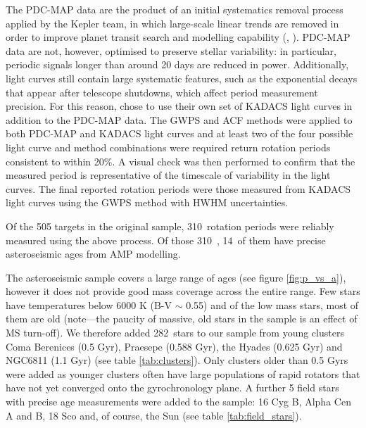 \documentclass[12pt,preprint]{aastex}
\newcommand{\nastero}{310~}
\newcommand{\nprecise}{14~}
\newcommand{\ncluster}{282~}
\begin{document}
The PDC-MAP data are the product of an initial systematics removal process applied by the Kepler team, in which large-scale linear trends are removed in order to improve planet transit search and modelling capability (\citet{Smith_2012}, \citet{Stumpe_2012}).
PDC-MAP data are not, however, optimised to preserve stellar variability: in particular, periodic signals longer than around 20 days are reduced in power.
Additionally, light curves still contain large systematic features, such as the exponential decays that appear after telescope shutdowns, which affect period measurement precision.
For this reason, \citet{Garcia2014} chose to use their own set of KADACS light curves in addition to the PDC-MAP data.
The GWPS and ACF methods were applied to both PDC-MAP and KADACS light curves and at least two of the four possible light curve and method combinations were required return rotation periods consistent to within 20\%.
A visual check was then performed to confirm that the measured period is representative of the timescale of variability in the light curves.
The final reported rotation periods were those measured from KADACS light curves using the GWPS method with HWHM uncertainties.

Of the 505 targets in the original sample, \nastero rotation periods were reliably measured using the above process.
Of those \nastero, \nprecise of them have precise asteroseismic ages from AMP modelling.

The asteroseismic sample covers a large range of ages (see figure \ref{fig:p_vs_a}), however it does not provide good mass coverage across the entire range.
Few stars have temperatures below 6000 K (B-V $\sim$ 0.55) and of the low mass stars, most of them are old (note---the paucity of massive, old stars in the sample is an effect of MS turn-off).
We therefore added \ncluster stars to our sample from young clusters Coma Berenices (0.5 Gyr), Praesepe (0.588 Gyr), the Hyades (0.625 Gyr) and NGC6811 (1.1 Gyr) (see table \ref{tab:clusters}).
Only clusters older than 0.5 Gyrs were added as younger clusters often have large populations of rapid rotators that have not yet converged onto the gyrochronology plane.
A further 5 field stars with precise age measurements were added to the sample: 16 Cyg B, Alpha Cen A and B, 18 Sco and, of course, the Sun (see table \ref{tab:field_stars}).
\end{document}
